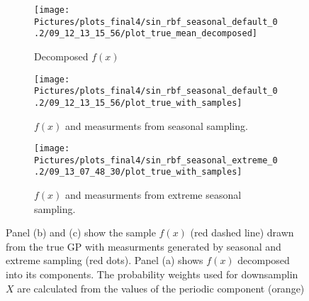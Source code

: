 %
%
%

\begin{figure}[!htb]
\centering
\begin{subfigure}{.3\textwidth}
    \centering
    \texttt{[image: 
        Pictures/plots\_final4/sin\_rbf\_seasonal\_default\_0.2/09\_12\_13\_15\_56/plot\_true\_mean\_decomposed]}
    \caption{Decomposed $f(x)$}
\end{subfigure}\hfill
\begin{subfigure}{.3\textwidth}
    \centering
    \texttt{[image: 
        Pictures/plots\_final4/sin\_rbf\_seasonal\_default\_0.2/09\_12\_13\_15\_56/plot\_true\_with\_samples]}
    \caption{$f(x)$ and measurments from seasonal sampling.}
\end{subfigure}\hfill
\begin{subfigure}{.3\textwidth}
    \centering
    \texttt{[image: 
        Pictures/plots\_final4/sin\_rbf\_seasonal\_extreme\_0.2/09\_13\_07\_48\_30/plot\_true\_with\_samples]}
    \caption{$f(x)$ and measurments from extreme seasonal sampling.}
\end{subfigure}
\caption[Seasonal Sampling Example]{Panel (b) and (c) show the sample $f(x)$ (red dashed line) drawn from the true GP with measurments generated
by seasonal and extreme sampling (red dots). Panel (a) shows $f(x)$ decomposed into its components.
The probability weights used for downsamplin $X$ are calculated
from the values of the periodic component (orange)}
\label{fig:seasonal-sampling}
\end{figure}



